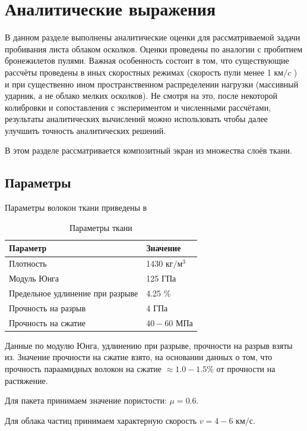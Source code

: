 \chapter{Аналитические выражения}\label{ch:equations}
В данном разделе выполнены аналитические оценки для рассматриваемой задачи пробивания листа облаком осколков.
Оценки проведены по аналогии с пробитием бронежилетов пулями.
Важная особенность состоит в том, что существующие рассчёты проведены в иных скоростных режимах (скорость пули менее
1 $км/c$ ) и при существенно ином пространственном распределении нагрузки (массивный ударник, а не облако мелких
осколков).
Не смотря на это, после некоторой колибровки и сопоставления с экспериментом и численными рассчётами, результаты
аналитических вычислений можно использовать чтобы далее улучшить точность аналитических решений.

В этом разделе рассматривается композитный экран из множества слоёв ткани.
\section{Параметры}
Параметры волокон ткани приведены в 

\begin{table}[h]
    \centering
    \caption{Параметры ткани}\label{tbl:kevlar-params}
    \begin{tabular}{|l|l|}
        \hline
        Параметр & Значение      \\ \hline
        Плотность & 1430 $кг/м^3$ \\ \hline
        Модуль Юнга & 125 ГПа       \\ \hline
        Предельное удлинение при разрыве & 4.25 \%       \\ \hline
        Прочность на разрыв & 4 ГПа         \\ \hline
        Прочность на сжатие & $40-60$ МПа     \\ \hline
    \end{tabular}
\end{table}

Данные по модулю Юнга, удлинению при разрыве, прочности на разрыв взяты из\cite{perepelkin2009,mikhailin2013}.
Значение прочности на сжатие взято, на основании данных\cite{papkov1986} о том, что прочность параамидных волокон
на сжатие $\approx 1.0 - 1.5 \%$ от прочности на растяжение.

Для пакета принимаем значение пористости: $\mu=0.6$\cite{buzov2004}.

Для облака частиц принимаем характерную скорость $v=4-6$ $км/с$.

